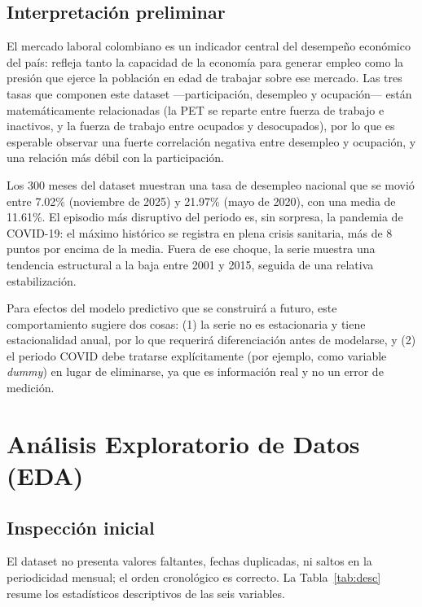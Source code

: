\documentclass[11pt,a4paper]{article}
\begin{document}
\subsection{Interpretación preliminar}

El mercado laboral colombiano es un indicador central del desempeño económico del país: refleja tanto la capacidad de la economía para generar empleo como la presión que ejerce la población en edad de trabajar sobre ese mercado. Las tres tasas que componen este dataset —participación, desempleo y ocupación— están matemáticamente relacionadas (la PET se reparte entre fuerza de trabajo e inactivos, y la fuerza de trabajo entre ocupados y desocupados), por lo que es esperable observar una fuerte correlación negativa entre desempleo y ocupación, y una relación más débil con la participación.

Los 300 meses del dataset muestran una tasa de desempleo nacional que se movió entre 7.02\% (noviembre de 2025) y 21.97\% (mayo de 2020), con una media de 11.61\%. El episodio más disruptivo del periodo es, sin sorpresa, la pandemia de COVID-19: el máximo histórico se registra en plena crisis sanitaria, más de 8 puntos por encima de la media. Fuera de ese choque, la serie muestra una tendencia estructural a la baja entre 2001 y 2015, seguida de una relativa estabilización.

Para efectos del modelo predictivo que se construirá a futuro, este comportamiento sugiere dos cosas: (1) la serie no es estacionaria y tiene estacionalidad anual, por lo que requerirá diferenciación antes de modelarse, y (2) el periodo COVID debe tratarse explícitamente (por ejemplo, como variable \textit{dummy}) en lugar de eliminarse, ya que es información real y no un error de medición.

\newpage
\section{Análisis Exploratorio de Datos (EDA)}

\subsection{Inspección inicial}

El dataset no presenta valores faltantes, fechas duplicadas, ni saltos en la periodicidad mensual; el orden cronológico es correcto. La Tabla~\ref{tab:desc} resume los estadísticos descriptivos de las seis variables.
\end{document}

